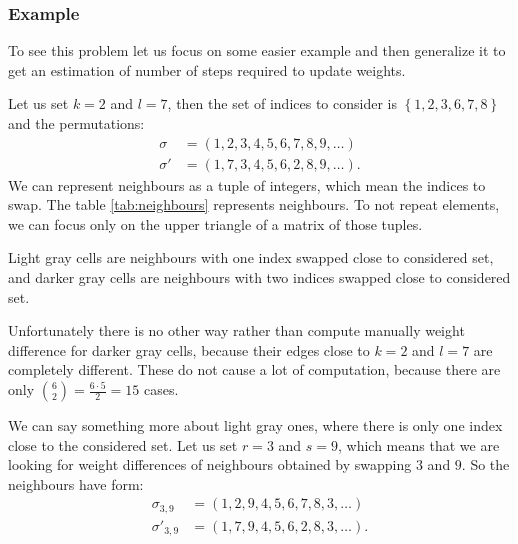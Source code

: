 	\subsubsection{Example}
		To see this problem let us focus on some easier example and then generalize it to get an estimation of number of steps required to update weights.
		
		Let us set $k=2$ and $l=7$, then the set of indices to consider is $\left\{ 1,2,3,6,7,8 \right\}$ and the permutations:
		\begin{align*}
			\sigma &= (1, 2, 3, 4, 5, 6, 7, 8, 9, \ldots) \\
			\sigma' &= (1, 7, 3, 4, 5, 6, 2, 8, 9, \ldots).
		\end{align*}
		We can represent neighbours as a tuple of integers, which mean the indices to swap. The table \ref{tab:neighbours} represents neighbours. To not repeat elements, we can focus only on the upper triangle of a matrix of those tuples.
		
		
		
		Light gray cells are neighbours with one index swapped close to considered set, and darker gray cells are neighbours with two indices swapped close to considered set. 
		
		Unfortunately there is no other way rather than compute manually weight difference for darker gray cells, because their edges close to $k=2$ and $l=7$ are completely different. These do not cause a lot of computation, because there are only $\binom{6}{2} = \frac{6 \cdot 5}{2}=15$ cases.
		
		We can say something more about light gray ones, where there is only one index close to the considered set. Let us set $r=3$ and $s=9$, which means that we are looking for weight differences of neighbours obtained by swapping $3$ and $9$. So the neighbours have form:
		\begin{align*}
			\sigma_{3,9} &= (1, 2, 9, 4, 5, 6, 7, 8, 3, \ldots) \\
			\sigma'_{3,9} &= (1, 7, 9, 4, 5, 6, 2, 8, 3, \ldots).
		\end{align*}
		
